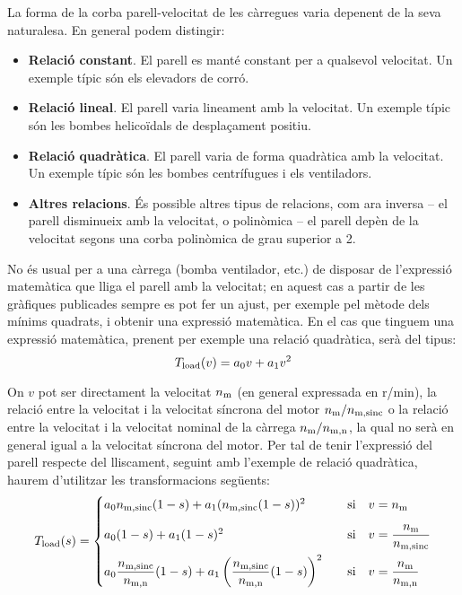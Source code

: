 La forma de la corba parell-velocitat de les càrregues varia depenent de la seva naturalesa. En general podem distingir:
\begin{itemize}
	\item  \textbf{Relació constant}. El parell es manté constant per a qualsevol velocitat. Un exemple típic són els elevadors de corró.
	
	\item  \textbf{Relació lineal}. El parell varia lineament amb la velocitat. Un exemple típic són les bombes helicoïdals de desplaçament positiu.
	
	\item  \textbf{Relació quadràtica}. El parell varia de forma  quadràtica  amb la velocitat. Un exemple típic són les bombes centrífugues i els ventiladors.
	
	\item  \textbf{Altres relacions}. És possible altres tipus de relacions, com ara inversa -- el parell disminueix amb la velocitat, o polinòmica -- el parell depèn de la velocitat segons una corba polinòmica de grau superior a 2.
\end{itemize}

No és  usual per a una càrrega (bomba ventilador, etc.) de disposar de l'expressió matemàtica que lliga el parell amb la velocitat; en aquest cas a partir de les gràfiques publicades sempre es pot fer un ajust, per exemple pel mètode dels mínims quadrats, i obtenir una expressió matemàtica. En el cas que tinguem una expressió matemàtica, prenent per exemple una relació quadràtica, serà del tipus:
\begin{equation}
	T_\mathrm{load}(v) = a_0 v + a_1 v^2
\end{equation}

On $v$ pot ser directament la velocitat $n_\mathrm{m}$ (en general expressada en r/min),  la relació entre la velocitat i la velocitat síncrona del motor $n_\mathrm{m}/n_\mathrm{m,sinc}$ o la relació entre la velocitat i la velocitat nominal de la càrrega $n_\mathrm{m}/n_\mathrm{m,n}$, la qual no serà en general igual a la velocitat síncrona del motor. Per tal de tenir l'expressió del parell respecte del lliscament,  seguint amb l'exemple de relació quadràtica, haurem d'utilitzar les transformacions següents:
\begin{equation}\label{eq:Tload-v-s}
	T_\mathrm{load}(s) = \begin{cases}
		 a_0 n_\mathrm{m,sinc}(1-s) + a_1 (n_\mathrm{m,sinc}(1-s))^2  & \quad\text{si}\quad v=n_\mathrm{m}  \\[2ex]
		a_0 (1-s) + a_1 (1-s)^2 & \quad\text{si}\quad  v =\dfrac{n_\mathrm{m}}{n_\mathrm{m,sinc}} \\[2ex]
		 a_0 \dfrac{n_\mathrm{m,sinc}}{n_\mathrm{m,n}}(1-s) + a_1 \left(\dfrac{n_\mathrm{m,sinc}}{n_\mathrm{m,n}}(1-s)\right)^2 &   \quad\text{si}\quad v = \dfrac{n_\mathrm{m}}{n_\mathrm{m,n}}
	\end{cases}
\end{equation}


